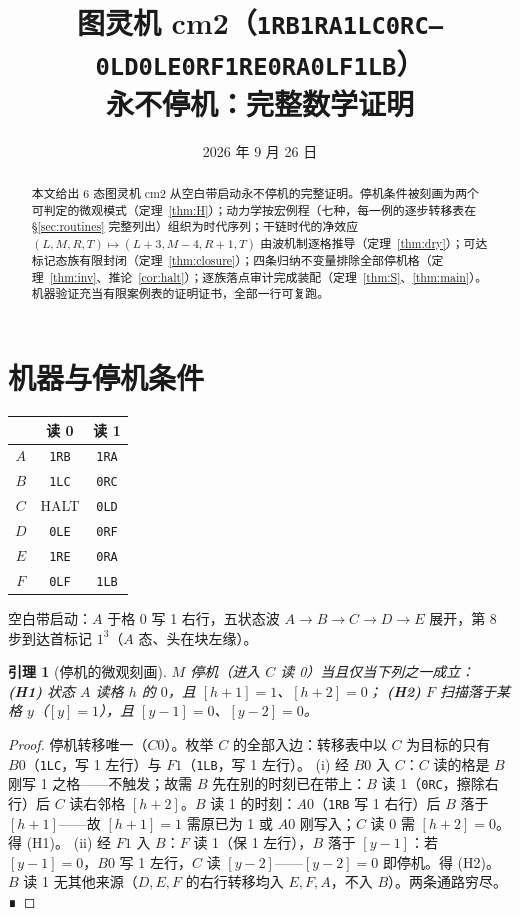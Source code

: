\documentclass[11pt]{ctexart}
\title{\bfseries 图灵机 cm2（\texttt{1RB1RA1LC0RC---0LD0LE0RF1RE0RA0LF1LB}）\\ \large 永不停机：完整数学证明}
\author{}
\date{2026 年 9 月 26 日}
\newtheorem{lemma}[theorem]{引理}
\theoremstyle{definition}
\newcommand{\HALT}{\textsf{HALT}}
\begin{document}
\maketitle

\begin{abstract}
本文给出 6 态图灵机 cm2 从空白带启动永不停机的完整证明。停机条件被刻画为两个可判定的微观模式（定理~\ref{thm:H}）；动力学按宏例程（七种，每一例的逐步转移表在 \S\ref{sec:routines} 完整列出）组织为时代序列；干链时代的净效应 $(L,M,R,T)\mapsto(L{+}3,M{-}4,R{+}1,T)$ 由波机制逐格推导（定理~\ref{thm:dry}）；可达标记态族有限封闭（定理~\ref{thm:closure}）；四条归纳不变量排除全部停机格（定理~\ref{thm:inv}、推论~\ref{cor:halt}）；逐族落点审计完成装配（定理~\ref{thm:S}、\ref{thm:main}）。机器验证充当有限案例表的证明证书，全部一行可复跑。
\end{abstract}

\section{机器与停机条件}

\begin{table}[h]\centering
\begin{tabular}{c|cc} & 读 0 & 读 1\\\toprule
$A$ & \texttt{1RB} & \texttt{1RA}\\
$B$ & \texttt{1LC} & \texttt{0RC}\\
$C$ & \HALT & \texttt{0LD}\\
$D$ & \texttt{0LE} & \texttt{0RF}\\
$E$ & \texttt{1RE} & \texttt{0RA}\\
$F$ & \texttt{0LF} & \texttt{1LB}\\
\end{tabular}\end{table}

空白带启动：$A$ 于格 0 写 1 右行，五状态波 $A{\to}B{\to}C{\to}D{\to}E$ 展开，第 8 步到达首标记 $1^3$（$A$ 态、头在块左缘）。

\begin{lemma}[停机的微观刻画]\label{thm:H}
$M$ 停机（进入 $C$ 读 0）当且仅当下列之一成立：
\textbf{(H1)} 状态 $A$ 读格 $h$ 的 $0$，且 $[h{+}1]=1$、$[h{+}2]=0$；
\textbf{(H2)} $F$ 扫描落于某格 $y$（$[y]=1$），且 $[y{-}1]=0$、$[y{-}2]=0$。
\end{lemma}
\begin{proof}
停机转移唯一（$C0$）。枚举 $C$ 的全部入边：转移表中以 $C$ 为目标的只有 $B0$（\texttt{1LC}，写 1 左行）与 $F1$（\texttt{1LB}，写 1 左行）。
(i) 经 $B0$ 入 $C$：$C$ 读的格是 $B$ 刚写 1 之格——不触发；故需 $B$ 先在别的时刻已在带上：$B$ 读 1（\texttt{0RC}，擦除右行）后 $C$ 读右邻格 $[h{+}2]$。$B$ 读 1 的时刻：$A0$（\texttt{1RB} 写 1 右行）后 $B$ 落于 $[h{+}1]$——故 $[h{+}1]=1$ 需原已为 1 或 $A0$ 刚写入；$C$ 读 0 需 $[h{+}2]=0$。得 (H1)。
(ii) 经 $F1$ 入 $B$：$F$ 读 1（保 1 左行），$B$ 落于 $[y{-}1]$：若 $[y{-}1]=0$，$B0$ 写 1 左行，$C$ 读 $[y{-}2]$——$[y{-}2]=0$ 即停机。得 (H2)。
$B$ 读 1 无其他来源（$D,E,F$ 的右行转移均入 $E,F,A$，不入 $B$）。两条通路穷尽。∎
\end{proof}
\end{document}
